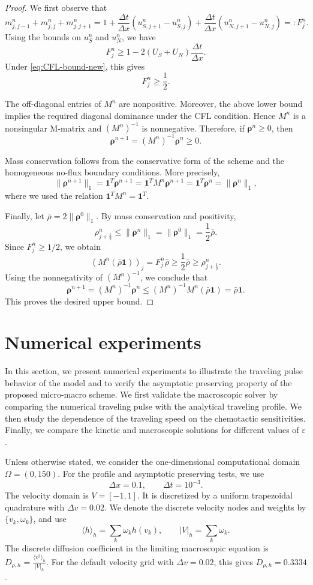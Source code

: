 \documentclass[11pt,twoside]{article}
\numberwithin{equation}{section}
\theoremstyle{plain}
\theoremstyle{nonumberplain}
\newtheorem{proof}{Proof.-}
\newcommand{\brho}{\boldsymbol{\rho}}
\begin{document}
{{\begin{proof}{\rm
We first observe that
\[
m_{j,j-1}^n+m_{j,j}^n+m_{j,j+1}^n
=
1+\frac{\Delta t}{\Delta x}
\left(u_{S,j+1}^n-u_{S,j}^n\right)
+\frac{\Delta t}{\Delta x}
\left(u_{N,j+1}^n-u_{N,j}^n\right)
=:F_j^n .
\]
Using the bounds on $u_S^n$ and $u_N^n$, we have
\[
F_j^n
\ge
1-2(U_S+U_N)\frac{\Delta t}{\Delta x}.
\]
Under \eqref{eq:CFL-bound-new}, this gives
\[
F_j^n\ge \frac12 .
\]

The off-diagonal entries of $M^n$ are nonpositive. Moreover, the above
lower bound implies the required diagonal dominance under the CFL
condition. Hence $M^n$ is a nonsingular M-matrix and $(M^n)^{-1}$ is
nonnegative. Therefore, if $\brho^n\ge0$, then
\[
\brho^{n+1}=(M^n)^{-1}\brho^n\ge0.
\]

Mass conservation follows from the conservative form of the scheme and the
homogeneous no-flux boundary conditions.  More precisely, 
\[
\|\brho^{n+1}\|_1
=
\mathbf 1^T\brho^{n+1}
=
\mathbf 1^T M^n\brho^{n+1}
=
\mathbf 1^T\brho^n
=
\|\brho^n\|_1 ,
\]
where we used the relation
\(
\mathbf 1^T M^n=\mathbf 1^T .
\)

Finally, let $\bar\rho=2\|\brho^0\|_1$. By mass conservation and
positivity,
\[
\rho_{j+\frac12}^n\le \|\brho^n\|_1=\|\brho^0\|_1=\frac12\bar\rho .
\]
Since $F_j^n\ge1/2$, we obtain
\[
(M^n(\bar\rho\mathbf 1))_j
=
F_j^n\bar\rho
\ge
\frac12\bar\rho
\ge
\rho_{j+\frac12}^n .
\]
Using the nonnegativity of $(M^n)^{-1}$, we conclude that
\[
\brho^{n+1}
=
(M^n)^{-1}\brho^n
\le
(M^n)^{-1}M^n(\bar\rho\mathbf 1)
=
\bar\rho\mathbf 1 .
\]
This proves the desired upper bound. }
\end{proof}



\section{Numerical experiments}\label{sec: numerics}

In this section, we present numerical experiments to illustrate the
traveling pulse behavior of the model and to verify the asymptotic
preserving property of the proposed micro-macro scheme. We first validate
the macroscopic solver by comparing the numerical traveling pulse with
the analytical traveling profile. We then study the dependence of the
traveling speed on the chemotactic sensitivities. Finally, we compare
the kinetic and macroscopic solutions for different values of
\(\varepsilon\).


Unless otherwise stated, we consider the one-dimensional computational
domain \(\Omega=(0,150)\). For the profile and asymptotic preserving
tests, we use
\[
\Delta x=0.1,
\qquad
\Delta t=10^{-3}.
\]
The velocity domain is \(V=[-1,1]\). It is discretized by a uniform
trapezoidal quadrature with \(\Delta v=0.02\). We denote the discrete
velocity nodes and weights by \(\{v_k,\omega_k\}\), and use
\[
\langle h\rangle_h=\sum_k\omega_k h(v_k),
\qquad
|V|_h=\sum_k\omega_k .
\]
The discrete diffusion coefficient in the limiting macroscopic equation
is
 $D_{\rho,h}
=
\frac{\langle v^2\rangle_h}{|V|_h}.$
For the default velocity grid with \(\Delta v=0.02\), this gives
\(D_{\rho,h}=0.3334\).

}}
\end{document}

